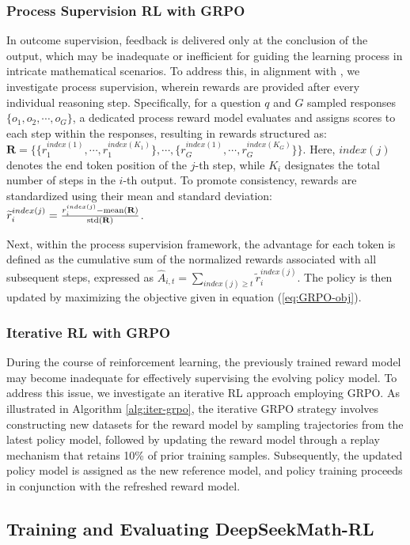 \begin{itemize}[topsep=0pt]
\begin{itemize}[topsep=0pt]
\subsubsection{Process Supervision RL with GRPO} In outcome supervision, feedback is delivered only at the conclusion of the output, which may be inadequate or inefficient for guiding the learning process in intricate mathematical scenarios. To address this, in alignment with \cite{wang2023math}, we investigate process supervision, wherein rewards are provided after every individual reasoning step. Specifically, for a question $q$ and $G$ sampled responses $\{o_1, o_2, \cdots, o_G\}$, a dedicated process reward model evaluates and assigns scores to each step within the responses, resulting in rewards structured as: $\mathbf{R} = \{ \{r_1^{index(1)},\cdots,r_1^{index(K_1)}\}, \cdots,  \{r_G^{index(1)},\cdots,r_G^{index(K_G)}\} \}$. Here, $index(j)$ denotes the end token position of the $j$-th step, while $K_i$ designates the total number of steps in the $i$-th output. To promote consistency, rewards are standardized using their mean and standard deviation: $\widetilde{r}_i^{index(j)} = \frac{r_i^{index(j)} - {\rm mean(\mathbf{R})}}{{\rm std(\mathbf{R})}}$.

Next, within the process supervision framework, the advantage for each token is defined as the cumulative sum of the normalized rewards associated with all subsequent steps, expressed as $\hat{A}_{i, t} = \sum_{index(j) \ge t} \widetilde{r}_i^{index(j)}$. The policy is then updated by maximizing the objective given in equation (\ref{eq:GRPO-obj}).

\subsubsection{Iterative RL with GRPO} During the course of reinforcement learning, the previously trained reward model may become inadequate for effectively supervising the evolving policy model. To address this issue, we investigate an iterative RL approach employing GRPO. As illustrated in Algorithm \ref{alg:iter-grpo}, the iterative GRPO strategy involves constructing new datasets for the reward model by sampling trajectories from the latest policy model, followed by updating the reward model through a replay mechanism that retains 10\% of prior training samples. Subsequently, the updated policy model is assigned as the new reference model, and policy training proceeds in conjunction with the refreshed reward model.

\subsection{Training and Evaluating DeepSeekMath-RL}


\end{itemize}
\end{itemize}
